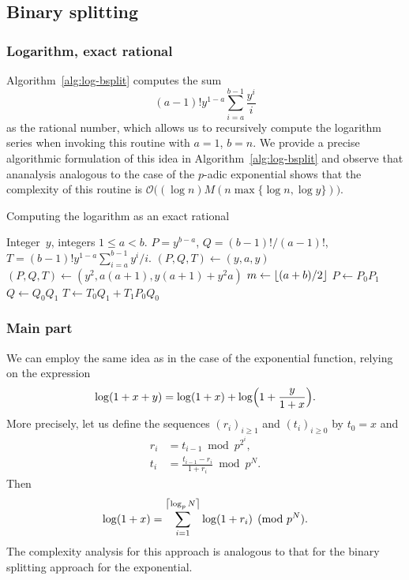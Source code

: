 \subsection{Binary splitting}

\subsubsection{Logarithm, exact rational}

Algorithm~\ref{alg:log-bsplit} computes the sum 
\begin{equation}
(a-1)! y^{1-a} \sum_{i=a}^{b-1} \frac{y^i}{i}
\end{equation}
as the rational number, which allows us to recursively compute the 
logarithm series when invoking this routine with $a = 1$, $b = n$.  
We provide a precise algorithmic formulation of this idea in 
Algorithm~\ref{alg:log-bsplit} and observe that ananalysis analogous 
to the case of the $p$-adic exponential shows that the complexity 
of this routine is 
$\mathcal{O}\bigl( (\log n) M(n\max\{\log n, \log y\}) \bigr)$.

\begin{algorithm}
\caption{Computing the  logarithm as an exact rational}
\label{alg:log-bsplit}
\begin{algorithmic}
\vspace{1mm}
\Require Integer~$y$, integers $1 \leq a < b$.
\Ensure  $P = y^{b-a}$, $Q = (b-1)! / (a-1)!$, $T = (b-1)! y^{1-a} \sum_{i=a}^{b-1} y^i / i$.
\State $(P, Q, T) \gets (y, a, y)$
\State $(P, Q, T) \gets (y^2, a (a + 1), y (a + 1) + y^2 a)$
\Else
\State $m \gets \left\lfloor(a + b) / 2\right\rfloor$
\State {}
\State {}
\State $P \gets P_0 P_1$
\State $Q \gets Q_0 Q_1$
\State $T \gets T_0 Q_1 + T_1 P_0 Q_0$
\EndIf
\EndProcedure
\end{algorithmic}
\end{algorithm}

\subsubsection{Main part}

We can employ the same idea as in the case of the exponential 
function, relying on the expression 
\begin{equation}
\log(1 + x + y) = \log(1 + x) + \log \Bigl(1 + \frac{y}{1+x}\Bigr).
\end{equation}
More precisely, let us define the sequences $(r_i)_{i \geq 1}$ and 
$(t_i)_{i \geq 0}$ by $t_0 = x$ and 
\begin{align}
r_i & = t_{i-1} \bmod{p^{2^i}}, \\
t_i & = \frac{t_{i-1} - r_i}{1 + r_i} \bmod{p^N}.
\end{align}
Then 
\begin{equation}
\log(1 + x) = \sum_{i=1}^{\left\lceil\log_p N\right\rceil} \log(1 + r_i) \pmod{p^N}.
\end{equation}
The complexity analysis for this approach is analogous to that for 
the binary splitting approach for the exponential.

